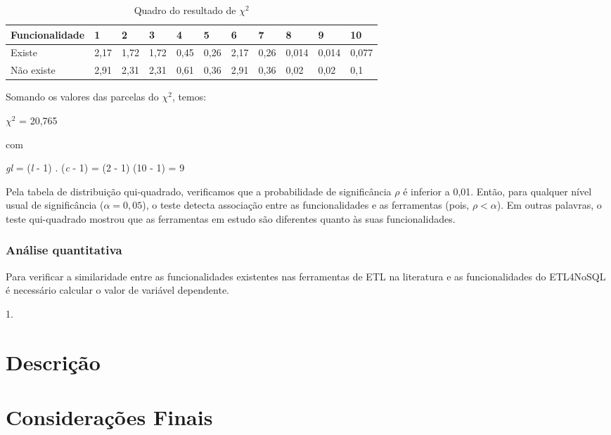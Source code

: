 \begin{table}[h]
	\centering
	\caption{Quadro do resultado de $ \chi^2 $}
	\label{chiquadrado}
	\begin{tabular}{|l|l|l|l|l|l|l|l|l|l|l|}
		\hline
		Funcionalidade & 1 & 2 & 3 & 4 & 5 & 6 & 7 & 8 & 9 & 10 \\ \hline
		Existe & 2,17 & 1,72 & 1,72 & 0,45 & 0,26 & 2,17 & 0,26 & 0,014 & 0,014 & 0,077  \\ \hline
		Não existe & 2,91 & 2,31 & 2,31 & 0,61 & 0,36 & 2,91 & 0,36 & 0,02 & 0,02 & 0,1 \\ \hline
	\end{tabular}
\end{table}

Somando os valores das parcelas do  $ \chi^2 $, temos: 

$ \chi^2 $ = 20,765

com

\textit{gl} = (\textit{l} - 1) . (\textit{c} - 1) = (2 - 1) (10 - 1) = 9

Pela tabela de distribuição qui-quadrado, verificamos que a probabilidade de significância $\rho$ é inferior a 0,01. Então, para qualquer nível usual de significância ($\alpha = 0,05$), o teste detecta associação entre as funcionalidades e as ferramentas (pois, $\rho < \alpha $). Em outras palavras, o teste qui-quadrado mostrou que as ferramentas em estudo são diferentes quanto às suas funcionalidades.

\subsubsection{Análise quantitativa}

Para verificar a similaridade entre as funcionalidades existentes nas ferramentas de ETL na literatura e as funcionalidades do ETL4NoSQL é necessário calcular o valor de variável dependente.

1. 




\section{Descrição}
\section{Considerações Finais}
